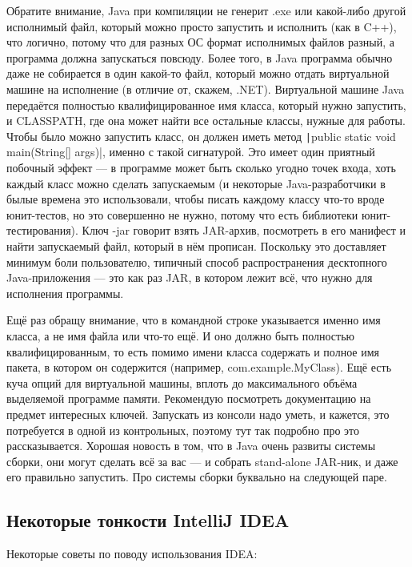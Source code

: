 \documentclass[a5paper]{article}
\begin{document}
Обратите внимание, Java при компиляции не генерит .exe или какой-либо другой исполнимый файл, который можно просто запустить и исполнить (как в C++), что логично, потому что для разных ОС формат исполнимых файлов разный, а программа должна запускаться повсюду. Более того, в Java программа обычно даже не собирается в один какой-то файл, который можно отдать виртуальной машине на исполнение (в отличие от, скажем, .NET). Виртуальной машине Java передаётся полностью квалифицированное имя класса, который нужно запустить, и CLASSPATH, где она может найти все остальные классы, нужные для работы. Чтобы было можно запустить класс, он должен иметь метод \texttt|public static void main(String[] args)|, именно с такой сигнатурой. Это имеет один приятный побочный эффект --- в программе может быть сколько угодно точек входа, хоть каждый класс можно сделать запускаемым (и некоторые Java-разработчики в былые времена это использовали, чтобы писать каждому классу что-то вроде юнит-тестов, но это совершенно не нужно, потому что есть библиотеки юнит-тестирования). Ключ -jar говорит взять JAR-архив, посмотреть в его манифест и найти запускаемый файл, который в нём прописан. Поскольку это доставляет минимум боли пользователю, типичный способ распространения десктопного Java-приложения --- это как раз JAR, в котором лежит всё, что нужно для исполнения программы.

Ещё раз обращу внимание, что в командной строке указывается именно имя класса, а не имя файла или что-то ещё. И оно должно быть полностью квалифицированным, то есть помимо имени класса содержать и полное имя пакета, в котором он содержится (например, com.example.MyClass). Ещё есть куча опций для виртуальной машины, вплоть до максимального объёма выделяемой программе памяти. Рекомендую посмотреть документацию на предмет интересных ключей. Запускать из консоли надо уметь, и кажется, это потребуется в одной из контрольных, поэтому тут так подробно про это рассказывается. Хорошая новость в том, что в Java очень развиты системы сборки, они могут сделать всё за вас --- и собрать stand-alone JAR-ник, и даже его правильно запустить. Про системы сборки буквально на следующей паре.

\subsection{Некоторые тонкости IntelliJ IDEA}

Некоторые советы по поводу использования IDEA:
\end{document}
